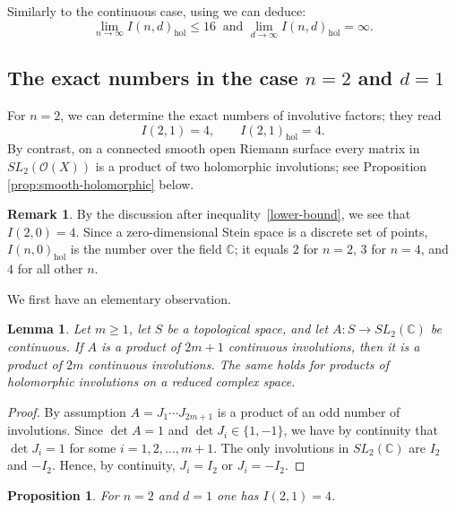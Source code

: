 \documentclass{amsart}
\newtheorem{lemma}[theorem]{Lemma}
\newcommand{\C}{\mathbb{C}}
\newcommand{\Ocal}{\mathcal O}
\newcommand{\hol}{\mathrm{hol}}
\newtheorem{proposition}[theorem]{Proposition}
\theoremstyle{definition}
\newtheorem{remark}[theorem]{Remark}%
\begin{document}
Similarly to the continuous case, using \cite{BrudSasa} we can deduce:
$$\lim_{n \to \infty} I(n,d)_{\hol} \le 16  \  \text{ and } \lim_{d \to \infty} I(n,d)_{\hol} = \infty.$$ 

\subsection{The exact numbers in the case \texorpdfstring{$n=2$ and $d=1$}{n=2 and d=1}}

For $n=2$, we can determine the exact numbers of involutive factors; they read
\begin{equation}\label{eq:two-widths}
 I(2,1)=4,\qquad I(2,1)_{\hol}=4.
\end{equation}
By contrast, on a connected smooth open Riemann surface every matrix in
$SL_2(\Ocal(X))$ is a product of two holomorphic involutions; see Proposition \ref{prop:smooth-holomorphic} below.
\bigskip

\begin{remark} By the discussion after inequality~\eqref{lower-bound}, we 
see that $I(2,0)=4$. Since a zero-dimensional Stein space is a discrete set of points, $I(n,0)_{\hol}$ is the number over the field $\C$; it equals $2$ for $n=2$, $3$ for $n=4$, and $4$ for all other $n$.
\end{remark}
We first have an elementary observation.

\begin{lemma}\label{lem:odd-to-even}
Let $m\geq1$, let $S$ be a topological space, and let
$A: S\to SL_2(\C)$ be continuous.  If $A$ is a product of $2m+1$
continuous involutions, then it is a product of $2m$ continuous involutions.
The same holds for products of holomorphic involutions on a reduced complex space.
\end{lemma}

\begin{proof}
    By assumption $A=J_1\cdots J_{2m+1}$ is a product of an odd number of involutions. Since $\det A = 1$ and $\det J_i \in \{1, -1\}$, we have by continuity that $\det J_i = 1$ for some $i = 1, 2, \dots, m+1$. The only involutions in $SL_2(\C)$ are $I_2$ and $-I_2$. Hence, by continuity, $J_i = I_2$ or $J_i = -I_2$. 
\end{proof}



\begin{proposition}\label{prop:continuous-rank-two}
For $n=2$ and $d=1$ one has
$I(2,1)=4$.
\end{proposition}
\end{document}

